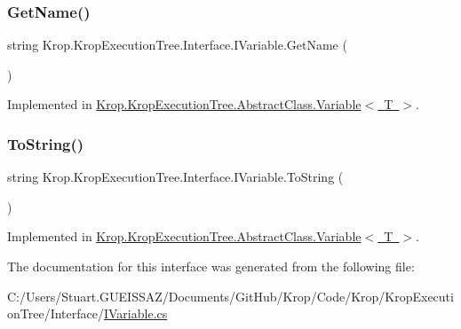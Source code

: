 \subsubsection{\texorpdfstring{Get\+Name()}{GetName()}}
{\footnotesize\ttfamily string Krop.\+Krop\+Execution\+Tree.\+Interface.\+I\+Variable.\+Get\+Name (\begin{DoxyParamCaption}{ }\end{DoxyParamCaption})}



Implemented in \mbox{\hyperlink{class_krop_1_1_krop_execution_tree_1_1_abstract_class_1_1_variable_a987550c24ebd0ceb01aec0b6edf51dfb}{Krop.\+Krop\+Execution\+Tree.\+Abstract\+Class.\+Variable$<$ T $>$}}.

\mbox{\label{interface_krop_1_1_krop_execution_tree_1_1_interface_1_1_i_variable_a4d3f36256ae24e2550ee0a16d3142822}} 
\subsubsection{\texorpdfstring{To\+String()}{ToString()}}
{\footnotesize\ttfamily string Krop.\+Krop\+Execution\+Tree.\+Interface.\+I\+Variable.\+To\+String (\begin{DoxyParamCaption}{ }\end{DoxyParamCaption})}



Implemented in \mbox{\hyperlink{class_krop_1_1_krop_execution_tree_1_1_abstract_class_1_1_variable_ae78ccbb029efb966e1edff0ae101f367}{Krop.\+Krop\+Execution\+Tree.\+Abstract\+Class.\+Variable$<$ T $>$}}.



The documentation for this interface was generated from the following file\+:\begin{DoxyCompactItemize}
\item 
C\+:/\+Users/\+Stuart.\+G\+U\+E\+I\+S\+S\+A\+Z/\+Documents/\+Git\+Hub/\+Krop/\+Code/\+Krop/\+Krop\+Execution\+Tree/\+Interface/\mbox{\hyperlink{_i_variable_8cs}{I\+Variable.\+cs}}\end{DoxyCompactItemize}
